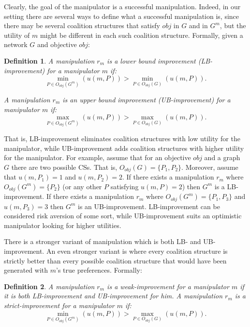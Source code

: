 \documentclass{article}
\newtheorem{definition}{Definition}
\begin{document}



Clearly, the goal of the manipulator is a successful manipulation. Indeed, in our setting there are several ways to define what a successful manipulation is, since there may be several coalition structures that satisfy $obj$ in $G$ and in $G^m$, but the utility of $m$ might be different in each such coalition structure. Formally, given a network $G$ and objective $obj$:
%


\begin{definition}
\label{defn:lower_bound_improvement}
A manipulation $r_m$ is a \emph{lower bound improvement} (LB-improvement) for a manipulator $m$ if:
\[
\underset{P\in O_{obj}(G^{m})}{\min}(u(m,P))>\underset{P\in O_{obj}(G)}{\min}(u(m,P)).
\]
%

\label{defn:upper_bound_improvement}
A manipulation $r_m$ is an \emph{upper bound improvement} (UB-improvement) for a manipulator $m$ if:
\[
\underset{P\in O_{obj}(G^{m})}{\max}(u(m,P))>\underset{P\in O_{obj}(G)}{\max}(u(m,P)).
\]
\end{definition}
That is, LB-improvement eliminates coalition structures with low utility for the manipulator, while UB-improvement adds coalition structures with higher utility for the manipulator. For example, assume that for an objective $obj$ and a graph $G$ there are two possible CSs. That is, $O_{obj}(G)=\{P_1,P_2\}$. Moreover, assume that $u(m,P_1)=1$ and $u(m,P_2)=2$. If there exists a manipulation $r_m$ where $O_{obj}(G^m)=\{P_2\}$ (or any other $P$ satisfying $u(m,P)=2$) then $G^m$ is a LB-improvement. If there exists a manipulation $r_m$ where $O_{obj}(G^m)=\{P_1,P_3\}$ and $u(m,P_3)=3$ then $G^m$ is an UB-improvement.
LB-improvement can be considered risk aversion of some sort, while UB-improvement suits an optimistic manipulator looking for higher utilities.
%

There is a stronger variant of manipulation which is both LB- and UB-improvement. An even stronger variant is where every coalition structure is strictly better than every possible coalition structure that would have been generated with $m$'s true preferences. Formally:
\begin{definition}
\label{improvement}
A manipulation $r_m$ is a \emph{weak-improvement} for a manipulator $m$ if it is both LB-improvement and UB-improvement for him.
\label{defn:strict_improvement}
A manipulation $r_m$ is a \emph{strict-improvement} for a manipulator $m$ if:
\[
\underset{P\in O_{obj}(G^{m})}{\min}(u(m,P))>\underset{P\in O_{obj}(G)}{\max}(u(m,P)).
\]
\end{definition}
\end{document}
